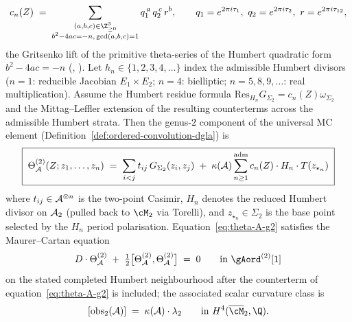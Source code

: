 \begin{proposition}
\begin{equation}\label{eq:humbert-fourier}
c_n(Z)\;=\;
\sum_{\substack{(a,b,c)\in\Z_{\geq 0}^{3}\\ b^{2}-4ac=-n,\,\gcd(a,b,c)=1}}
q_1^{\,a}\,q_2^{\,c}\,r^{b},
\qquad
q_1=e^{2\pi i\tau_1},\ q_2=e^{2\pi i\tau_2},\ r=e^{2\pi i\tau_{12}},
\end{equation}
the Gritsenko lift of the primitive theta-series of the Humbert
quadratic form $b^2-4ac=-n$
\textup{(}\cite{Gritsenko1994}, \cite[Ch.~III]{vdG1988}\textup{)}.
Let $h_n\in\{1,2,3,4,\ldots\}$ index the admissible Humbert
divisors \textup{(}$n=1$: reducible Jacobian $E_1\times E_2$;
$n=4$: bielliptic; $n=5,8,9,\ldots$: real multiplication\textup{)}.
Assume the Humbert residue formula
$\mathrm{Res}_{H_n}G_{\Sigma_2}=c_n(Z)\omega_{\Sigma_2}$ and the
Mittag--Leffler extension of the resulting counterterms across the
admissible Humbert strata.
Then the genus-$2$ component of the universal MC element
\textup{(}Definition~\ref{def:ordered-convolution-dgla}\textup{)} is
\begin{equation}\label{eq:theta-A-g2}
\boxed{\;
\Theta_{\mathcal{A}}^{(2)}(Z;z_{1},\ldots,z_{n})
\;=\;
\sum_{i<j} t_{ij}\,G_{\Sigma_2}(z_i,z_j)
\;+\;
\kappa(\mathcal{A})\sum_{n\geq 1}^{\mathrm{adm}}
c_n(Z)\cdot H_n\cdot T(z_{\star_n})
\;}
\end{equation}
where $t_{ij}\in\mathcal{A}^{\otimes n}$ is the two-point Casimir, $H_n$
denotes the reduced Humbert divisor on $\mathcal{A}_2$ \textup{(}pulled back
to $\cM_2$ via Torelli\textup{)}, and
$z_{\star_n}\in\Sigma_2$ is the base point selected by the $H_n$
period polarisation. Equation~\eqref{eq:theta-A-g2} satisfies the
Maurer--Cartan equation
\begin{equation}\label{eq:mc-g2}
D\cdot\Theta_\cA^{(2)}\;+\;\tfrac{1}{2}\bigl[\Theta_\cA^{(2)},
\Theta_\cA^{(2)}\bigr]\;=\;0
\qquad\textup{in }{\gAord}^{(2)}[1]
\end{equation}
on the stated completed Humbert neighbourhood after the counterterm of
equation~\eqref{eq:theta-A-g2} is included; the associated scalar
curvature class is
\begin{equation}\label{eq:obs-g2}
[\mathrm{obs}_{2}(\cA)]
\;=\;
\kscal(\cA)\cdot\lambda_{2}
\qquad \textup{in } H^{4}(\overline{\cM}_{2},\Q).
\end{equation}
\end{proposition}

